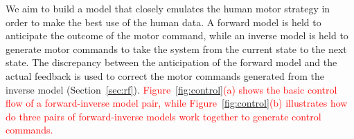 



We aim to build a model that closely emulates the human motor strategy
in order to make the best use of the human data. A forward model is
held to anticipate the outcome of the motor command, while an inverse
model is held to generate motor commands to take the system from the
current state to the next state. The discrepancy between the
anticipation of the forward model and the actual feedback is used to
correct the motor commands generated from the inverse model
(Section~\ref{sec:rf}). \textcolor{red}{Figure~\ref{fig:control}(a) shows the basic
control flow of a forward-inverse model pair, while Figure~\ref{fig:control}(b) illustrates how do three pairs of forward-inverse models work together to generate control commands.} 

